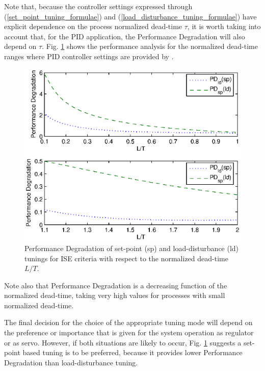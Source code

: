 Note that, because the controller settings expressed through
(\ref{set_point_tuning_formulae}) and
(\ref{load_disturbance_tuning_formulae}) have explicit dependence
on the process normalized dead-time $\tau$, it is worth taking
into account that, for the PID application, the Performance
Degradation will also depend on $\tau$. Fig. \ref{PerfDegradation}
shows the performance analysis for the normalized dead-time ranges
where PID controller settings are provided by
\cite{zhuangAthertonIEE1993}.

\begin{figure}[h!]
    \begin{center}
        \includegraphics[width=0.8\linewidth]{PerfDeg.eps}
        \caption{Performance Degradation of set-point (sp) and load-disturbance (ld) tunings for ISE criteria with respect to the
        normalized dead-time $L/T$.}
        \label{PerfDegradation}
    \end{center}
\end{figure}

Note also that Performance Degradation is a decreasing function of
the normalized dead-time, taking very high values for processes
with small normalized dead-time.

The final decision for the choice of the appropriate tuning mode
will depend on the preference or importance that is given for the
system operation as regulator or as servo. However, if both
situations are likely to occur, Fig. \ref{PerfDegradation}
suggests a set-point based tuning is to be preferred, because it
provides lower Performance Degradation than load-disturbance
tuning.
